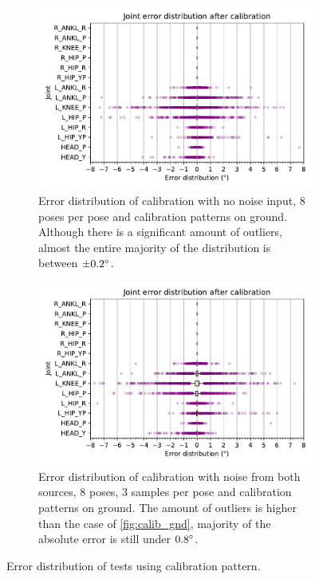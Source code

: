 \documentclass[english, printversion, nomenclature, notitle]{tuvisionthesis} %
\begin{document}
\begin{figure}
	\centering
	\begin{subfigure}{\columnwidth}
		\includegraphics[width=\columnwidth]{charuco_8_poses_nonoise.pdf}
		\caption{Error distribution of calibration with no noise input, 8 poses per pose and calibration patterns on ground. Although there is a significant amount of outliers, almost the entire majority of the distribution is between $\pm 0.2\degree$.}
	\end{subfigure}
	\begin{subfigure}{\columnwidth}
		\includegraphics[width=\columnwidth]{charuco_8_poses_both.pdf}
		\caption{Error distribution of calibration with noise from both sources, 8 poses, 3 samples per pose and calibration patterns on ground. The amount of outliers is higher than the case of \cref{fig:calib_gnd}, majority of the absolute error is still under $0.8\degree$.}
	\end{subfigure}
	\caption[Error distribition for tests using calibration pattern.]{Error distribution of tests using calibration pattern. }
	\label{fig:final_tests}
\end{figure}
\end{document}
